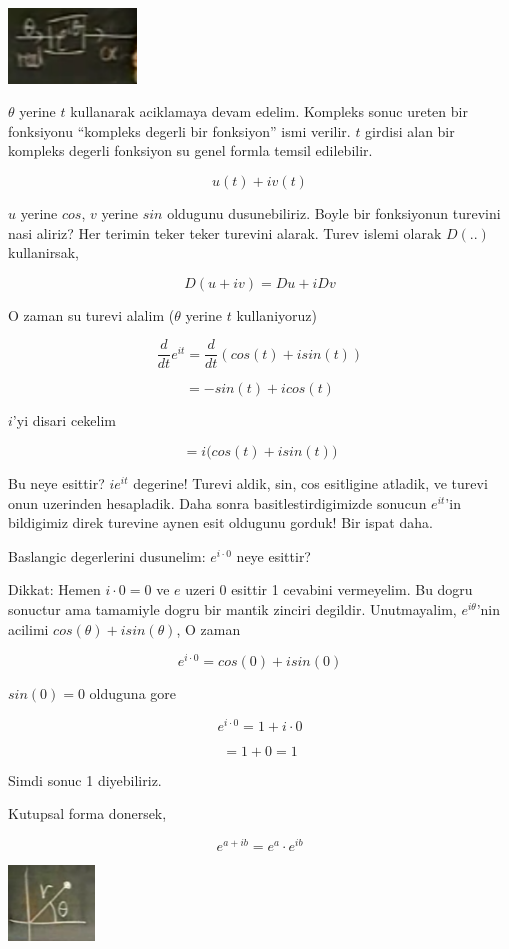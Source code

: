 \documentclass[12pt,fleqn]{article}
\begin{document}
\includegraphics[height=2cm]{6_3.png}

$\theta$ yerine $t$ kullanarak aciklamaya devam edelim. Kompleks sonuc
ureten bir fonksiyonu ``kompleks degerli bir fonksiyon'' ismi verilir. $t$
girdisi alan bir kompleks degerli fonksiyon su genel formla temsil
edilebilir. 

\[ u(t) + iv(t) \]

$u$ yerine $cos$, $v$ yerine $sin$ oldugunu dusunebiliriz. Boyle bir
fonksiyonun turevini nasi aliriz? Her terimin teker teker turevini
alarak. Turev islemi olarak $D(..)$ kullanirsak,

\[ D(u+iv) = Du + iDv \]

O zaman su turevi alalim ($\theta$ yerine $t$ kullaniyoruz) 

\[ \frac{d}{dt}e^{it} = \frac{d}{dt}(cos(t) + isin(t)) \]

\[ = -sin(t) + icos(t) \]

$i$'yi disari cekelim

\[ = i \bigg( cos(t) + isin(t) \bigg) \]

Bu neye esittir? $ie^{it}$ degerine! Turevi aldik, sin, cos esitligine
atladik, ve turevi onun uzerinden hesapladik. Daha sonra
basitlestirdigimizde sonucun $e^{it}$'in bildigimiz direk turevine aynen
esit oldugunu gorduk! Bir ispat daha. 

Baslangic degerlerini dusunelim: $e^{i\cdot 0}$ neye esittir? 

Dikkat: Hemen $i \cdot 0 = 0$ ve $e$ uzeri $0$ esittir 1 cevabini
vermeyelim. Bu dogru sonuctur ama tamamiyle dogru bir mantik zinciri
degildir. Unutmayalim, $e^{i\theta}$'nin acilimi $cos(\theta) +
isin(\theta)$, O zaman

\[ e^{i \cdot 0} = cos(0) + isin(0) \]

$sin(0) = 0$ olduguna gore

\[ e^{i \cdot 0} = 1 + i \cdot 0 \]

\[ = 1 +  0  = 1\]

Simdi sonuc 1 diyebiliriz.

Kutupsal forma donersek, 

\[ e^{a+ib}  = e^a \cdot e^{ib}\]

\includegraphics[height=2cm]{6_4.png}
\end{document}
